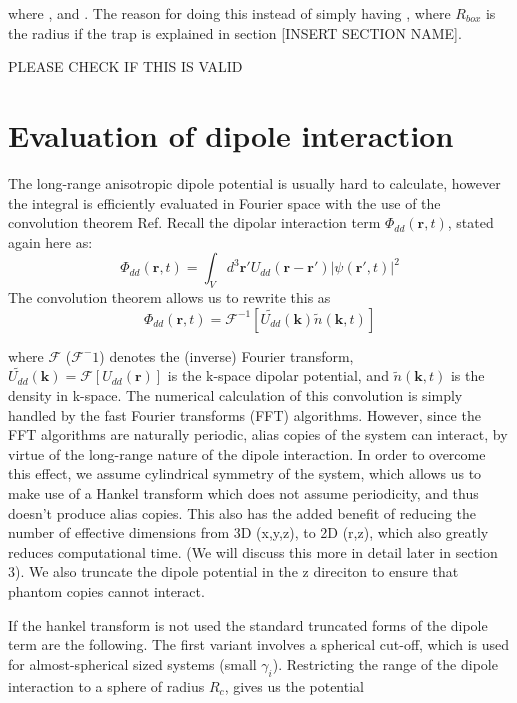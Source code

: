 \documentclass[10pt]{article}
\numberwithin{equation}{section}
\begin{document}
\begin{multicols}{2}
where , 
and . The reason for doing this instead of simply having  , where $R_{box}$ is 
the radius if the trap is explained in section [INSERT SECTION NAME].

PLEASE CHECK IF THIS IS VALID


\section{Evaluation of dipole interaction}
The long-range anisotropic dipole potential is usually hard to calculate, however the integral is efficiently evaluated in Fourier space with the use of the convolution theorem Ref\cite{bland2018elementary}. Recall the dipolar interaction term $\Phi_{dd}(\textbf{r},t)$, stated again here as:
\begin{equation}
\Phi_{dd}(\textbf{r},t) = \int_V d^3\textbf{r}' U_{dd}(\textbf{r}-\textbf{r}')|\psi(\textbf{r}',t)|^2
\end{equation}
The convolution theorem allows us to rewrite this as
\begin{equation}
\Phi_{dd}(\textbf{r},t) = \mathcal{F}^{-1} [ \tilde{U_{dd}}(\textbf{k})\tilde{n}(\textbf{k},t)]
\end{equation}

where $\mathcal{F}$ ($\mathcal{F}^-1$) denotes the (inverse) Fourier transform, $\tilde{U_{dd}}(\textbf{k}) = \mathcal{F}[U_{dd}(\textbf{r})]$ is the k-space dipolar potential, and $\tilde{n}(\textbf{k},t)$ is the density in k-space. The numerical calculation of this convolution is simply handled by the fast Fourier transforms (FFT) algorithms. However, since the FFT algorithms are naturally periodic, alias copies of the system can interact, by virtue of the long-range nature of the dipole interaction. In order to overcome this effect, we assume cylindrical symmetry of the system, which allows us to make use of a Hankel transform which does not assume periodicity, and thus doesn't produce alias copies. This also has the added benefit of reducing the number of effective dimensions from 3D (x,y,z), to 2D (r,z), which also greatly reduces computational time. (We will discuss this more in detail later in section 3). We also truncate the dipole potential in the z direciton to ensure that phantom copies cannot interact.

If the hankel transform is not used the standard truncated forms of the dipole term are the following. The first variant involves a spherical cut-off, which is used for almost-spherical sized systems (small $\gamma_i$). Restricting the range of the dipole interaction to a sphere of radius $R_c$, gives us the potential


\end{multicols}
\end{document}
